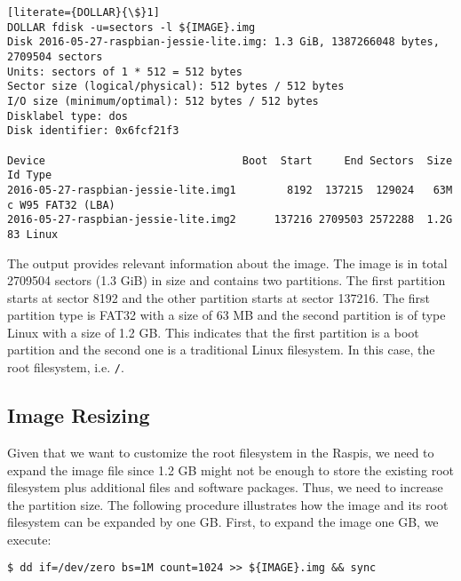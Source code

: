 \begin{lstlisting}[literate={DOLLAR}{\$}1]
DOLLAR fdisk -u=sectors -l ${IMAGE}.img
Disk 2016-05-27-raspbian-jessie-lite.img: 1.3 GiB, 1387266048 bytes, 2709504 sectors
Units: sectors of 1 * 512 = 512 bytes
Sector size (logical/physical): 512 bytes / 512 bytes
I/O size (minimum/optimal): 512 bytes / 512 bytes
Disklabel type: dos
Disk identifier: 0x6fcf21f3

Device                               Boot  Start     End Sectors  Size Id Type
2016-05-27-raspbian-jessie-lite.img1        8192  137215  129024   63M  c W95 FAT32 (LBA)
2016-05-27-raspbian-jessie-lite.img2      137216 2709503 2572288  1.2G 83 Linux
\end{lstlisting}
\FloatBarrier

The output provides relevant information about the image. The image is in
total 2709504 sectors (1.3 GiB) in size and contains two partitions. The
first partition starts at sector 8192 and the other partition starts at
sector 137216. The first partition type is FAT32 with a size of 63 MB
and the second partition is of type Linux with a size of 1.2 GB. This
indicates that the first partition is a boot partition and the second
one is a traditional Linux filesystem. In this case, the root filesystem, i.e. \texttt{/}.

\subsection{Image Resizing}
Given that we want to customize the root filesystem in the \ac{Raspi}s,
we need to expand the image file since 1.2 GB might not be enough to store
the existing root filesystem plus additional files and software packages.
Thus,
we need to increase the partition size. The following procedure illustrates
how the image and its root filesystem can be expanded by one GB.
First, to expand the image one GB, we execute:

\begin{lstlisting}[]
$ dd if=/dev/zero bs=1M count=1024 >> ${IMAGE}.img && sync
\end{lstlisting}
\FloatBarrier
\vspace{-5mm}

